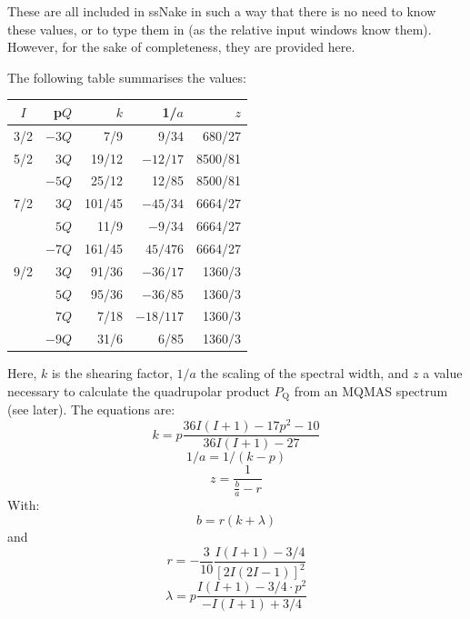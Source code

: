\documentclass[11pt,a4paper]{article}
\begin{document}
These are all included in ssNake in such a way that there is no need to know
these values, or to type them in (as the relative input windows know them). However, for the sake of
completeness, they are provided here.

The following table summarises the values:
\begin{center}
\begin{tabular}[h]{c r r r r}
  \toprule
  $I$ & p$Q$ & $k$ & 1/$a$ & $z$\\
  \midrule
  3/2 & $-3Q$ & 7/9 & 9/34 & 680/27\\
  5/2 & $3Q$ & 19/12 & $-12/17$& 8500/81\\
   & $-5Q$ & 25/12 &12/85& 8500/81 \\
  7/2 & $3Q$ & 101/45 & $-45/34$& 6664/27 \\
   & $5Q$ & 11/9 & $-9/34$ & 6664/27\\
   & $-7Q$ & 161/45 & $45/476$ & 6664/27\\
  9/2 & $3Q$ & 91/36 &  $-36/17$ & 1360/3 \\
   & $5Q$ & 95/36 & $-36/85$ & 1360/3 \\
	& $7Q$ & 7/18 & $-18/117$ & 1360/3 \\
	& $-9Q$ & 31/6 & 6/85 & 1360/3 \\
  \bottomrule
\end{tabular}
\end{center}
Here, $k$ is the shearing factor, $1/a$ the scaling of the spectral width, and $z$ a value necessary
to calculate the quadrupolar product $P_\text{Q}$ from an MQMAS spectrum (see later). The equations
are:
\begin{equation}
  k = p \frac{36I(I+1)-17p^2 - 10}{36I(I+1) - 27}
\end{equation}
\begin{equation}
  1/a = 1/(k - p)
\end{equation}
  \begin{equation}
	 z = \frac{1}{\frac{b}{a}-r}
  \end{equation}
  With:
 \begin{equation}
	b = r	(k + \lambda)
 \end{equation}
 and
 \begin{equation}
	r = -\frac{3}{10}\frac{I(I+1)-3/4}{[2I(2I-1)]^2}
 \end{equation}
 \begin{equation}
	\lambda = p \frac{I(I+1)-3/4 \cdot p^2}{-I(I+1)+3/4}
 \end{equation}
\end{document}
